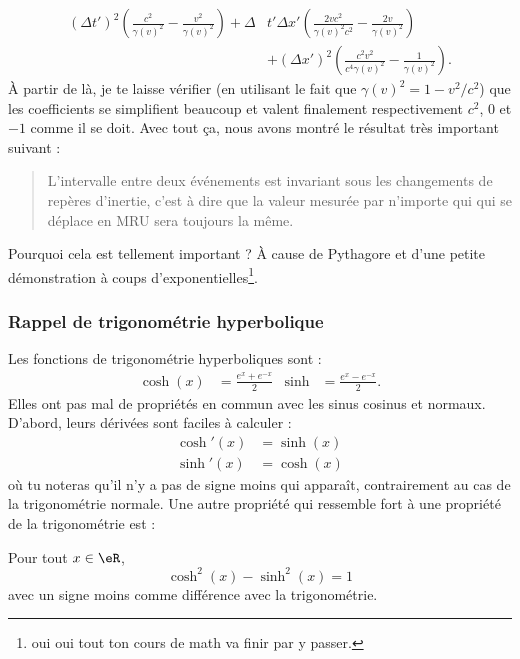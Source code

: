 \[ 
\begin{split}
  (\Delta t')^2\left( \frac{ c^2 }{ \gamma(v)^2 }-\frac{ v^2 }{ \gamma(v)^2 } \right)+\Delta &t'\Delta x'\left( \frac{ 2vc^2 }{ \gamma(v)^2c^2 }-\frac{ 2v }{ \gamma(v)^2 } \right)\\
	&+(\Delta x')^2\left( \frac{ c^2 v^2 }{ c^4\gamma(v)^2 }-\frac{1}{ \gamma(v)^2 } \right).
\end{split}
\]
À partir de là, je te laisse vérifier (en utilisant le fait que $\gamma(v)^2=1-v^2/c^2$) que les coefficients se simplifient beaucoup et valent finalement respectivement $c^2$, $0$ et $-1$ comme il se doit. Avec tout ça, nous avons montré le résultat très important suivant : 
\begin{quote}
L'intervalle entre deux événements est invariant sous les changements de repères d'inertie, c'est à dire que la valeur mesurée par n'importe qui qui se déplace en MRU sera toujours la même.
\end{quote}
Pourquoi cela est tellement important ? À cause de Pythagore et d'une petite démonstration à coups d'exponentielles\footnote{oui oui tout ton cours de math va finir par y passer.}.

\subsubsection{Rappel de trigonométrie hyperbolique}
\label{SUBSUBSECooZVHLooYwuhAj}

Les fonctions de trigonométrie hyperboliques sont :
\begin{align}
\cosh(x)&=\frac{  e^{x}+ e^{-x} }{ 2 }&\sinh&=\frac{  e^{x}- e^{-x} }{ 2 }.
\end{align}
Elles ont pas mal de propriétés en commun avec les sinus cosinus et normaux. D'abord, leurs dérivées sont faciles à calculer :
\[ 
\begin{split}
\cosh'(x)&=\sinh(x)\\
\sinh'(x)&=\cosh(x)
\end{split}  
\]
où tu noteras qu'il n'y a pas de signe moins qui apparaît, contrairement au cas de la trigonométrie normale. Une autre propriété qui ressemble fort à une propriété de la trigonométrie est :

\begin{proposition}
Pour tout $x\in\eR$,
\begin{equation}
	\cosh^2(x)-\sinh^2(x)=1
\end{equation}
avec un signe moins comme différence avec la trigonométrie.
\end{proposition}

